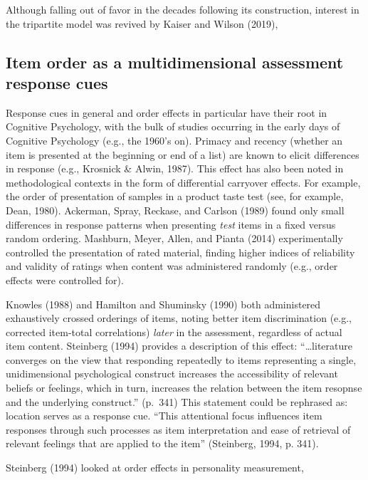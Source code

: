 \documentclass[
  man]{apa6}
\begin{document}
Although falling out of favor in the decades following its construction, interest in the tripartite model was revived by Kaiser and Wilson (2019),

\hypertarget{item-order-as-a-multidimensional-assessment-response-cues}{%
\subsection{Item order as a multidimensional assessment response cues}\label{item-order-as-a-multidimensional-assessment-response-cues}}

Response cues in general and order effects in particular have their root in Cognitive Psychology, with the bulk of studies occurring in the early days of Cognitive Psychology (e.g., the 1960's on). Primacy and recency (whether an item is presented at the beginning or end of a list) are known to elicit differences in response (e.g., Krosnick \& Alwin, 1987). This effect has also been noted in methodological contexts in the form of differential carryover effects. For example, the order of presentation of samples in a product taste test (see, for example, Dean, 1980). Ackerman, Spray, Reckase, and Carlson (1989) found only small differences in response patterns when presenting \emph{test} items in a fixed versus random ordering. Mashburn, Meyer, Allen, and Pianta (2014) experimentally controlled the presentation of rated material, finding higher indices of reliability and validity of ratings when content was administered randomly (e.g., order effects were controlled for).

Knowles (1988) and Hamilton and Shuminsky (1990) both administered exhaustively crossed orderings of items, noting better item discrimination (e.g., corrected item-total correlations) \emph{later} in the assessment, regardless of actual item content. Steinberg (1994) provides a description of this effect: ``\ldots literature converges on the view that responding repeatedly to items representing a single, unidimensional psychological construct increases the accessibility of relevant beliefs or feelings, which in turn, increases the relation between the item resopnse and the underlying construct.'' (p.~341) This statement could be rephrased as: location serves as a response cue. ``This attentional focus influences item responses through such processes as item interpretation and ease of retrieval of relevant feelings that are applied to the item'' (Steinberg, 1994, p. 341).

Steinberg (1994) looked at order effects in personality measurement,
\end{document}
